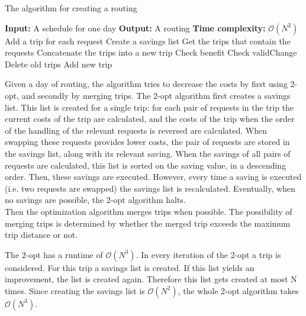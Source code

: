 \documentclass[a4paper]{article}
\begin{document}
\begin{algorithm}
	\caption{The algorithm for creating a routing}
	\label{routing}
	\begin{algorithmic}
		\State \textbf{Input:} A schedule for one day
		\State \textbf{Output:} A routing
		\State \textbf{Time complexity:} $\mathcal{O}(N^2)$
		\State Add a trip for each request 
		\State Create a savings list 
		 
			\State Get the trips that contain the requests
				\State Concatenate the trips into a new trip 
					\State Check benefit
					\State Check validChange
						\State Delete old trips
						\State Add new trip
					\EndIf
				\EndIf
			\EndIf
		\EndFor
	\end{algorithmic}
\end{algorithm}

Given a day of routing, the algorithm tries to decrease the costs by first using 2-opt, and secondly by merging trips. The 2-opt algorithm first creates a savings list. This list is created for a single trip: for each pair of requests in the trip the current costs of the trip are calculated, and the costs of the trip when the order of the handling of the relevant requests is reversed are calculated. When swapping these requests provides lower costs, the pair of requests are stored in the savings list, along with its relevant saving. When the savings of all pairs of requests are calculated, this list is sorted on the saving value, in a descending order. Then, these savings are executed. However, every time a saving is executed (i.e. two requests are swapped) the savings list is recalculated. Eventually, when no savings are possible, the 2-opt algorithm halts. \\ Then the optimization algorithm merges trips when possible. The possibility of merging trips is determined by whether the merged trip exceeds the maximum trip distance or not. 

The 2-opt has a runtime of $\mathcal{O}(N^3)$. In every iteration of the 2-opt a trip is considered. For this trip a savings list is created. If this list yields an improvement, the list is created again. Therefore this list gets created at most N times. Since creating the savings list is $\mathcal{O}(N^2)$, the whole 2-opt algorithm takes $\mathcal{O}(N^3)$. \\
\end{document}
